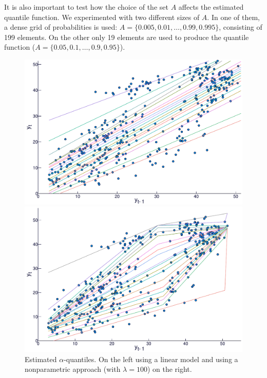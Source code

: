 It is also important to test how the choice of the set $A$ affects the estimated quantile function. We experimented with two different sizes of $A$. In one of them, a dense grid of probabilities is used:   $A=\{0.005, 0.01, \dots, 0.99, 0.995 \}$, consisting of 199 elements. On the other only 19 elements are used to produce the quantile function ($A=\{0.05, 0.1, \dots, 0.9, 0.95 \}$).

\begin{figure}
  \centering
  \begin{minipage}[t]{\linewidth}
    \centering
    \begin{minipage}[t]{0.45\linewidth}
      \centering     \includegraphics[width=\textwidth]{Figuras/regressao-quantilica/icaraizinho-quantile-linear-scatter}
    \end{minipage}
    \begin{minipage}[t]{0.45\linewidth}
      \centering     \includegraphics[width=\textwidth]{Figuras/regressao-quantilica/icaraizinho-quantile-nonpar-scatter-lambda30}
    \end{minipage}
  \end{minipage}
  \caption{Estimated $\alpha$-quantiles. On the left using a linear model and using a nonparametric approach (with $\lambda = 100$) on the right.}
  \label{fig:scatterplot-alphaquantiles}
\end{figure}




